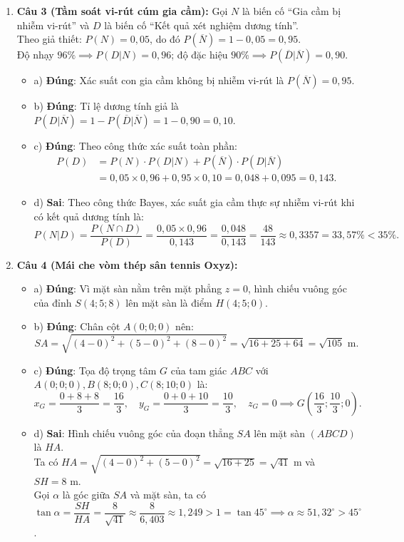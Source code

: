 \documentclass[12pt,a4paper]{article}
\begin{document}
\begin{enumerate}[label=\textbf{Câu \arabic*:}, leftmargin=*]
\item \textbf{Câu 3 (Tầm soát vi-rút cúm gia cầm):}
Gọi $N$ là biến cố ``Gia cầm bị nhiễm vi-rút'' và $D$ là biến cố ``Kết quả xét nghiệm dương tính''.\\
Theo giả thiết: $P(N) = 0{,}05$, do đó $P(\overline{N}) = 1 - 0{,}05 = 0{,}95$.\\
Độ nhạy $96\% \implies P(D|N) = 0{,}96$; độ đặc hiệu $90\% \implies P(\overline{D}|\overline{N}) = 0{,}90$.
\begin{itemize}
    \item a) \textbf{Đúng}: Xác suất con gia cầm không bị nhiễm vi-rút là $P(\overline{N}) = 0{,}95$.
    \item b) \textbf{Đúng}: Tỉ lệ dương tính giả là $P(D|\overline{N}) = 1 - P(\overline{D}|\overline{N}) = 1 - 0{,}90 = 0{,}10$.
    \item c) \textbf{Đúng}: Theo công thức xác suất toàn phần:
    \begin{align*}
    P(D) &= P(N) \cdot P(D|N) + P(\overline{N}) \cdot P(D|\overline{N}) \\
    &= 0{,}05 \times 0{,}96 + 0{,}95 \times 0{,}10 = 0{,}048 + 0{,}095 = 0{,}143.
    \end{align*}
    \item d) \textbf{Sai}: Theo công thức Bayes, xác suất gia cầm thực sự nhiễm vi-rút khi có kết quả dương tính là:
    $$P(N|D) = \dfrac{P(N \cap D)}{P(D)} = \dfrac{0{,}05 \times 0{,}96}{0{,}143} = \dfrac{0{,}048}{0{,}143} = \dfrac{48}{143} \approx 0{,}3357 = 33{,}57\% < 35\%.$$
\end{itemize}

\item \textbf{Câu 4 (Mái che vòm thép sân tennis Oxyz):}
\begin{itemize}
    \item a) \textbf{Đúng}: Vì mặt sàn nằm trên mặt phẳng $z = 0$, hình chiếu vuông góc của đỉnh $S(4; 5; 8)$ lên mặt sàn là điểm $H(4; 5; 0)$.
    \item b) \textbf{Đúng}: Chân cột $A(0; 0; 0)$ nên:
    $$SA = \sqrt{(4 - 0)^2 + (5 - 0)^2 + (8 - 0)^2} = \sqrt{16 + 25 + 64} = \sqrt{105}\text{ m}.$$
    \item c) \textbf{Đúng}: Tọa độ trọng tâm $G$ của tam giác $ABC$ với $A(0; 0; 0), B(8; 0; 0), C(8; 10; 0)$ là:
    $$x_G = \dfrac{0 + 8 + 8}{3} = \dfrac{16}{3},\quad y_G = \dfrac{0 + 0 + 10}{3} = \dfrac{10}{3},\quad z_G = 0 \implies G\left(\dfrac{16}{3}; \dfrac{10}{3}; 0\right).$$
    \item d) \textbf{Sai}: Hình chiếu vuông góc của đoạn thẳng $SA$ lên mặt sàn $(ABCD)$ là $HA$.\\
    Ta có $HA = \sqrt{(4 - 0)^2 + (5 - 0)^2} = \sqrt{16 + 25} = \sqrt{41}\text{ m}$ và $SH = 8\text{ m}$.\\
    Gọi $\alpha$ là góc giữa $SA$ và mặt sàn, ta có $\tan\alpha = \dfrac{SH}{HA} = \dfrac{8}{\sqrt{41}} \approx \dfrac{8}{6{,}403} \approx 1{,}249 > 1 = \tan 45^\circ \implies \alpha \approx 51{,}32^\circ > 45^\circ$.
\end{itemize}

\end{enumerate}
\end{document}
